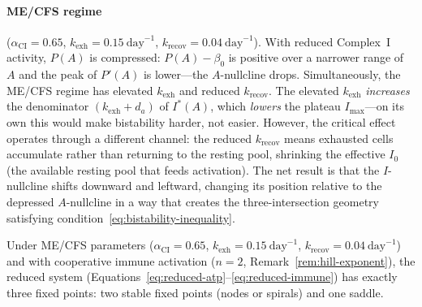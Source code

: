 \paragraph{ME/CFS regime} ($\alpha_{\text{CI}} = 0.65$, $k_{\text{exh}} = 0.15\ \text{day}^{-1}$, $k_{\text{recov}} = 0.04\ \text{day}^{-1}$).
With reduced Complex~I activity, $P(A)$ is compressed: $P(A) - \beta_0$ is positive over a narrower range of $A$ and the peak of $P'(A)$ is lower---the $A$-nullcline drops. Simultaneously, the ME/CFS regime has elevated $k_{\text{exh}}$ and reduced $k_{\text{recov}}$. The elevated $k_{\text{exh}}$ \emph{increases} the denominator $(k_{\text{exh}} + d_a)$ of $I^*(A)$, which \emph{lowers} the plateau $I_{\max}$---on its own this would make bistability harder, not easier. However, the critical effect operates through a different channel: the reduced $k_{\text{recov}}$ means exhausted cells accumulate rather than returning to the resting pool, shrinking the effective $I_0$ (the available resting pool that feeds activation). The net result is that the $I$-nullcline shifts downward and leftward, changing its position relative to the depressed $A$-nullcline in a way that creates the three-intersection geometry satisfying condition~\ref{eq:bistability-inequality}. \begin{proposition}
\label{prop:bistability}
Under ME/CFS parameters ($\alpha_{\text{CI}} = 0.65$, $k_{\text{exh}} = 0.15\ \text{day}^{-1}$, $k_{\text{recov}} = 0.04\ \text{day}^{-1}$) and with cooperative immune activation ($n = 2$, Remark~\ref{rem:hill-exponent}), the reduced system (Equations~\ref{eq:reduced-atp}--\ref{eq:reduced-immune}) has exactly three fixed points: two stable fixed points (nodes or spirals) and one saddle.
\end{proposition}

